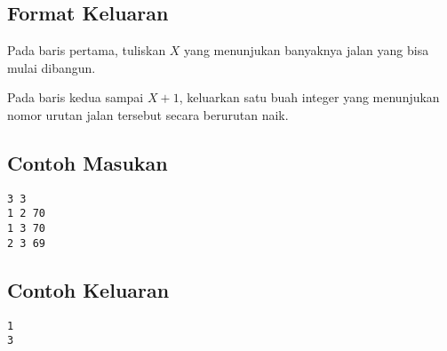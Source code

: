 \documentclass{article}
\begin{document}
\subsection*{Format Keluaran}

Pada baris pertama, tuliskan $X$ yang menunjukan banyaknya jalan yang bisa mulai dibangun.

Pada baris kedua sampai $X + 1$, keluarkan satu buah integer yang menunjukan nomor urutan jalan tersebut secara berurutan naik.
\\

\begin{multicols}{2}
\subsection*{Contoh Masukan}
\begin{lstlisting}
3 3
1 2 70
1 3 70
2 3 69
\end{lstlisting}
\columnbreak
\subsection*{Contoh Keluaran}
\begin{lstlisting}
1
3
\end{lstlisting}
\vfill
\null
\end{multicols}


\pagebreak
\end{document}
